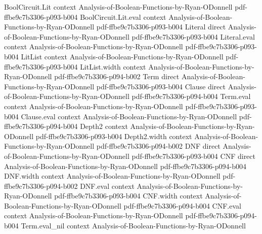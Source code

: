 \begin{lemma}
\leanok
{}
\proofstep
  {BoolCircuit.Lit}
  {context}
  {Analysis-of-Boolean-Functions-by-Ryan-ODonnell}
  {pdf-ffbe9c7b3306-p093-b004}
\proofstep
  {BoolCircuit.Lit.eval}
  {context}
  {Analysis-of-Boolean-Functions-by-Ryan-ODonnell}
  {pdf-ffbe9c7b3306-p093-b004}
\proofstep
  {Literal}
  {direct}
  {Analysis-of-Boolean-Functions-by-Ryan-ODonnell}
  {pdf-ffbe9c7b3306-p093-b004}
\proofstep
  {Literal.eval}
  {context}
  {Analysis-of-Boolean-Functions-by-Ryan-ODonnell}
  {pdf-ffbe9c7b3306-p093-b004}
\proofstep
  {LitList}
  {context}
  {Analysis-of-Boolean-Functions-by-Ryan-ODonnell}
  {pdf-ffbe9c7b3306-p093-b004}
\proofstep
  {LitList.width}
  {context}
  {Analysis-of-Boolean-Functions-by-Ryan-ODonnell}
  {pdf-ffbe9c7b3306-p094-b002}
\proofstep
  {Term}
  {direct}
  {Analysis-of-Boolean-Functions-by-Ryan-ODonnell}
  {pdf-ffbe9c7b3306-p093-b004}
\proofstep
  {Clause}
  {direct}
  {Analysis-of-Boolean-Functions-by-Ryan-ODonnell}
  {pdf-ffbe9c7b3306-p094-b004}
\proofstep
  {Term.eval}
  {context}
  {Analysis-of-Boolean-Functions-by-Ryan-ODonnell}
  {pdf-ffbe9c7b3306-p093-b004}
\proofstep
  {Clause.eval}
  {context}
  {Analysis-of-Boolean-Functions-by-Ryan-ODonnell}
  {pdf-ffbe9c7b3306-p094-b004}
\proofstep
  {Depth2}
  {context}
  {Analysis-of-Boolean-Functions-by-Ryan-ODonnell}
  {pdf-ffbe9c7b3306-p093-b004}
\proofstep
  {Depth2.width}
  {context}
  {Analysis-of-Boolean-Functions-by-Ryan-ODonnell}
  {pdf-ffbe9c7b3306-p094-b002}
\proofstep
  {DNF}
  {direct}
  {Analysis-of-Boolean-Functions-by-Ryan-ODonnell}
  {pdf-ffbe9c7b3306-p093-b004}
\proofstep
  {CNF}
  {direct}
  {Analysis-of-Boolean-Functions-by-Ryan-ODonnell}
  {pdf-ffbe9c7b3306-p094-b004}
\proofstep
  {DNF.width}
  {context}
  {Analysis-of-Boolean-Functions-by-Ryan-ODonnell}
  {pdf-ffbe9c7b3306-p094-b002}
\proofstep
  {DNF.eval}
  {context}
  {Analysis-of-Boolean-Functions-by-Ryan-ODonnell}
  {pdf-ffbe9c7b3306-p093-b004}
\proofstep
  {CNF.width}
  {context}
  {Analysis-of-Boolean-Functions-by-Ryan-ODonnell}
  {pdf-ffbe9c7b3306-p094-b004}
\proofstep
  {CNF.eval}
  {context}
  {Analysis-of-Boolean-Functions-by-Ryan-ODonnell}
  {pdf-ffbe9c7b3306-p094-b004}
\proofstep
  {Term.eval_nil}
  {context}
  {Analysis-of-Boolean-Functions-by-Ryan-ODonnell}

\end{lemma}
